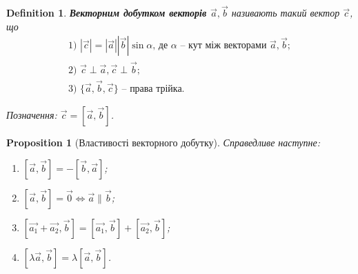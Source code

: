 \documentclass[a4paper, 10pt]{extarticle}
\theoremstyle{theoremdd}
\theoremstyle{theoremdd}
\newtheorem{definition}[theorem]{Definition}
\theoremstyle{theoremdd}
\theoremstyle{theoremdd}
\theoremstyle{theoremdd}
\newtheorem{proposition}[theorem]{Proposition}
\theoremstyle{theoremdd}
\theoremstyle{theoremdd}
\theoremstyle{theoremdd}
\begin{document}
\begin{definition}
	\textbf{Векторним добутком векторів $\vec{a}, \vec{b}$} називають такий вектор $\vec{c}$, що
	\begin{align*}
	\text{1) } |\vec{c}| = |\vec{a}| |\vec{b}| \sin \alpha \text{, де $\alpha$ -- кут між векторами $\vec{a},\vec{b}$}; \\
	\text{2) }  \vec{c} \perp \vec{a}, \vec{c} \perp \vec{b}; \\
	\text{3) } \{\vec{a}, \vec{b}, \vec{c}\} \text{ -- права трійка}.
	\end{align*}
\begin{figure}[H]
\centering
{}
\end{figure}
Позначення: $\vec{c} = [\vec{a}, \vec{b}]$.
\end{definition}

\begin{proposition}[Властивості векторного добутку]
Справедливе наступне:
\begin{enumerate}[nosep,wide=0pt,label={\arabic*)}]
\item $[\vec{a}, \vec{b}] = -[\vec{b}, \vec{a}]$;
\item $[\vec{a}, \vec{b}] = \vec{0} \iff \vec{a} \parallel \vec{b}$;
\item $[\vec{a_1} + \vec{a_2}, \vec{b}] = [\vec{a_1}, \vec{b}] + [\vec{a_2}, \vec{b}]$;
\item $[\lambda \vec{a}, \vec{b}] = \lambda [\vec{a}, \vec{b}]$.
\end{enumerate}
\end{proposition}
\end{document}
